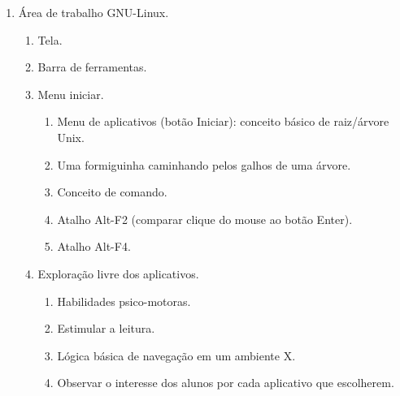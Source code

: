 \begin{enumerate}
	\item Área de trabalho GNU-Linux.
	\begin{enumerate}
		\item Tela.
		\item Barra de ferramentas.
		\item Menu iniciar.
		\begin{enumerate}
			\item Menu de aplicativos (botão Iniciar): conceito básico de raiz/árvore Unix.
			\item Uma formiguinha caminhando pelos galhos de uma árvore.
			\item Conceito de comando.
			\item Atalho Alt-F2 (comparar clique do mouse ao botão Enter).
			\item Atalho Alt-F4.
		\end{enumerate}
	\item Exploração livre dos aplicativos.
	\begin{enumerate}
		\item Habilidades psico-motoras.
		\item Estimular a leitura.
		\item Lógica básica de navegação em um ambiente X.
		\item Observar o interesse dos alunos por cada aplicativo que escolherem.
	\end{enumerate}
	\end{enumerate}
\end{enumerate}
